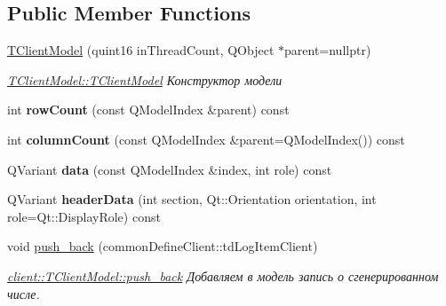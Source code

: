\subsection*{Public Member Functions}
\begin{DoxyCompactItemize}
\item 
\mbox{\label{classclient_1_1_t_client_model_a56d1ca59a519931a703e024698c83a42}} 
\hyperlink{classclient_1_1_t_client_model_a56d1ca59a519931a703e024698c83a42}{T\+Client\+Model} (quint16 in\+Thread\+Count, Q\+Object $\ast$parent=nullptr)
\begin{DoxyCompactList}\small\item\em \hyperlink{classclient_1_1_t_client_model_a56d1ca59a519931a703e024698c83a42}{T\+Client\+Model\+::\+T\+Client\+Model} Конструктор модели \end{DoxyCompactList}\item 
\mbox{\label{classclient_1_1_t_client_model_a282427450592390fce094bdc9645b00f}} 
int {\bfseries row\+Count} (const Q\+Model\+Index \&parent) const
\item 
\mbox{\label{classclient_1_1_t_client_model_ada4b178e21da50180ec36f2faf8e89d2}} 
int {\bfseries column\+Count} (const Q\+Model\+Index \&parent=Q\+Model\+Index()) const
\item 
\mbox{\label{classclient_1_1_t_client_model_ac8203af327c334a6b28bddd2c2f4626c}} 
Q\+Variant {\bfseries data} (const Q\+Model\+Index \&index, int role) const
\item 
\mbox{\label{classclient_1_1_t_client_model_a3e5645fece3531d74e2961968a3ea597}} 
Q\+Variant {\bfseries header\+Data} (int section, Qt\+::\+Orientation orientation, int role=Qt\+::\+Display\+Role) const
\item 
void \hyperlink{classclient_1_1_t_client_model_aed00383c6177d60cb6f4b34b23fce485}{push\+\_\+back} (common\+Define\+Client\+::td\+Log\+Item\+Client)
\begin{DoxyCompactList}\small\item\em \hyperlink{classclient_1_1_t_client_model_aed00383c6177d60cb6f4b34b23fce485}{client\+::\+T\+Client\+Model\+::push\+\_\+back} Добавляем в модель запись о сгенерированном числе. \end{DoxyCompactList}\item 

\end{DoxyCompactItemize}
